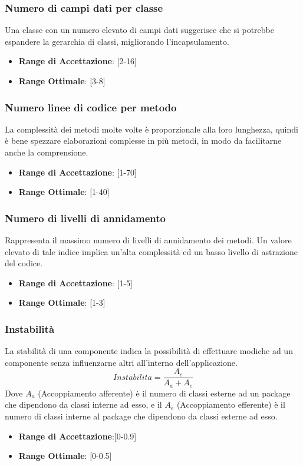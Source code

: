 \documentclass[12pt,a4paper]{article}
\begin{document}
\subsubsection{Numero di campi dati per classe}
Una classe con un numero elevato di campi dati suggerisce che si potrebbe espandere la gerarchia di classi, migliorando l'incapsulamento.
\begin{itemize}
\item \textbf{Range di Accettazione}: [2-16]
\item \textbf{Range Ottimale}: [3-8]
\end{itemize}
\subsubsection{Numero linee di codice per metodo}
La complessità dei metodi molte volte è proporzionale alla loro lunghezza,
quindi è bene spezzare elaborazioni complesse in più metodi, in modo da facilitarne anche la comprensione.
\begin{itemize}
\item \textbf{Range di Accettazione}: [1-70]
\item \textbf{Range Ottimale}: [1-40]
\end{itemize}
\subsubsection{Numero di livelli di annidamento}
Rappresenta il massimo numero di livelli di annidamento dei metodi. Un valore elevato di tale indice implica un'alta complessità ed un basso livello di astrazione del codice.
\begin{itemize}
\item \textbf{Range di Accettazione}: [1-5]
\item \textbf{Range Ottimale}: [1-3]
\end{itemize}
\subsubsection{Instabilità}
La stabilità di una componente indica la possibilità di effettuare modiche ad un componente senza influenzarne altri all'interno dell'applicazione.
\[Instabilita=\frac{A_e}{A_a+A_e}\]
Dove $A_a$ (Accoppiamento afferente) è il numero di classi esterne ad un package che dipendono da classi interne ad esso, e il $A_e$ (Accoppiamento efferente) è il numero di classi interne al package che dipendono da classi esterne ad esso.
\begin{itemize}
\item \textbf{Range di Accettazione}:[0-0.9]
\item \textbf{Range Ottimale}: [0-0.5]
\end{itemize}
\end{document}
